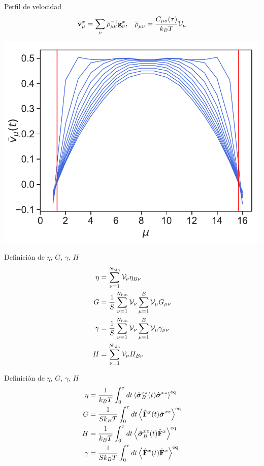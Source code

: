 \documentclass{beamer}
\begin{document}
\begin{frame}{Perfil de velocidad}
\begin{align}
  \overline{\bf v}^x_\mu=\sum_{\nu}\overline{\rho}_{\mu\nu}^{-1}{\bf g}^x_\nu, &&
  \overline{\rho}_{\mu\nu}=\frac{C_{\mu\nu}(\tau)}{k_BT}  {\cal V}_\mu
  \nonumber
\end{align}

  \begin{center}
  \includegraphics[width=0.7\linewidth]{vtCorrected-17nodes-WALLS-defense}
  \end{center}
\end{frame}


\begin{frame}{Definición de $\eta$, $G$, $\gamma$, $H$}
\begin{align}
  \eta&= \sum^{N_{\rm bin}}_{\nu=1} {\cal V}_\nu \eta_{B\nu}
\nonumber\\
G &=  \frac{1}{S} \sum^{N_{\rm bin}}_{\nu=1} {\cal V}_\nu \sum^{B}_{\mu=1}{\cal V}_\mu G_{\mu\nu}
\nonumber\\
\gamma&=  \frac{1}{S}\sum^{N_{\rm bin}}_{\nu=1}{\cal V}_\nu\sum^{B}_{\mu=1}{\cal V}_\mu \gamma_{\mu\nu}
\nonumber\\
H&= \sum^{N_{\rm bin}}_{\nu=1} {\cal V}_\nu H_{B\nu}
\nonumber
\end{align}
\end{frame}

\begin{frame}{Definición de $\eta$, $G$, $\gamma$, $H$}
\begin{align}
\eta&= \frac{1}{k_BT}\int_0^{\tau} dt
\left\langle  \hat{\boldsymbol{\sigma}}^{xz}_{B}(t) \hat{\boldsymbol{\sigma}}^{xz}\right\rangle^{\rm eq}
\nonumber\\
G &=   \frac{1}{Sk_BT}\int_0^{\tau} dt
\left\langle  \hat{\bf F}^{x}(t) \hat{\boldsymbol{\sigma}}^{xz}\right\rangle^{\rm eq}
\nonumber\\
H &=   \frac{1}{k_BT}\int_0^{\tau} dt
\left\langle  \hat{\boldsymbol{\sigma}}^{xz}_{B}(t) \hat{\bf F}^{x}\right\rangle^{\rm eq}
\nonumber\\
\gamma&= 
\frac{1}{Sk_BT}\int_0^{\tau} dt
\left\langle  \hat{\bf F}^{x}(t)\hat{\bf F}^{x}\right\rangle^{\rm eq}
\nonumber
\end{align}


\end{frame}
\end{document}
